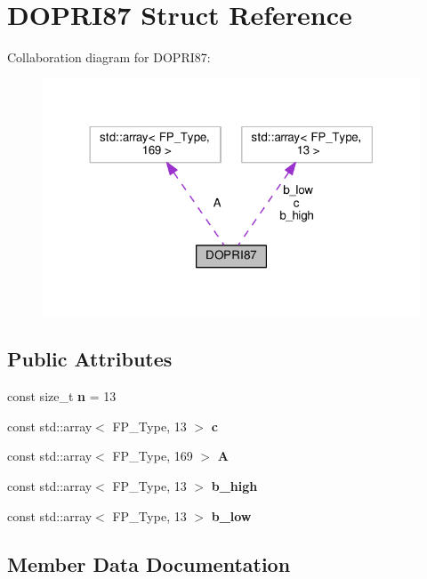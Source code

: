 \hypertarget{structDOPRI87}{}\section{D\+O\+P\+R\+I87 Struct Reference}
\label{structDOPRI87}


Collaboration diagram for D\+O\+P\+R\+I87\+:\nopagebreak
\begin{figure}[H]
\begin{center}
\leavevmode
\includegraphics[width=318pt]{structDOPRI87__coll__graph}
\end{center}
\end{figure}
\subsection*{Public Attributes}
\begin{DoxyCompactItemize}
\item 
\mbox{\label{structDOPRI87_a5be2549f8041e5c535e477493f284ccb}} 
const size\+\_\+t {\bfseries n} = 13
\item 
const std\+::array$<$ F\+P\+\_\+\+Type, 13 $>$ {\bfseries c}
\item 
const std\+::array$<$ F\+P\+\_\+\+Type, 169 $>$ {\bfseries A}
\item 
const std\+::array$<$ F\+P\+\_\+\+Type, 13 $>$ {\bfseries b\+\_\+high}
\item 
const std\+::array$<$ F\+P\+\_\+\+Type, 13 $>$ {\bfseries b\+\_\+low}
\end{DoxyCompactItemize}


\subsection{Member Data Documentation}
\mbox{\label{structDOPRI87_a58504e2f3eabbf35b2d4f0e54ebb8d5f}} 
